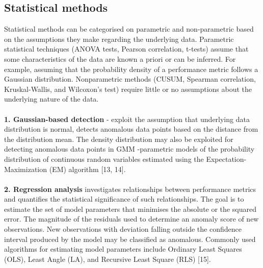 \documentclass[]{usiinfprospectus}
\begin{document}
\subsection{Statistical methods}
Statistical methods can be categorised on parametric and non-parametric based on the assumptions they make regarding the underlying data. Parametric statistical techniques (ANOVA tests, Pearson correlation, t-tests) assume that some characteristics of the data are known a priori or can be inferred. For example, assuming that the probability density of a performance metric follows a Gaussian distribution. Nonparametric methods (CUSUM, Spearman correlation, Kruskal-Wallis, and Wilcoxon's test) require little or no assumptions about the underlying nature of the data.\\\\
%
\textbf {1. Gaussian-based detection} - exploit the assumption that underlying data distribution is normal, detects anomalous data points based on the distance from the distribution mean. The density distribution may also be exploited for detecting anomalous data points in GMM -parametric models of the probability distribution of continuous random variables estimated using the Expectation-Maximization (EM) algorithm [13, 14].\\\\
%
\textbf {2. Regression analysis} investigates relationships between performance metrics and quantifies the statistical significance of such relationships. The goal is to estimate the set of model parameters that minimises the absolute or the squared error. The magnitude of the residuals used to determine an anomaly score of new observations. New observations with deviation falling outside the confidence interval produced by the model may be classified as anomalous. Commonly used algorithms for estimating model parameters include Ordinary Least Squares (OLS), Least Angle (LA), and Recursive Least Square (RLS) [15].\\\\
\end{document}
